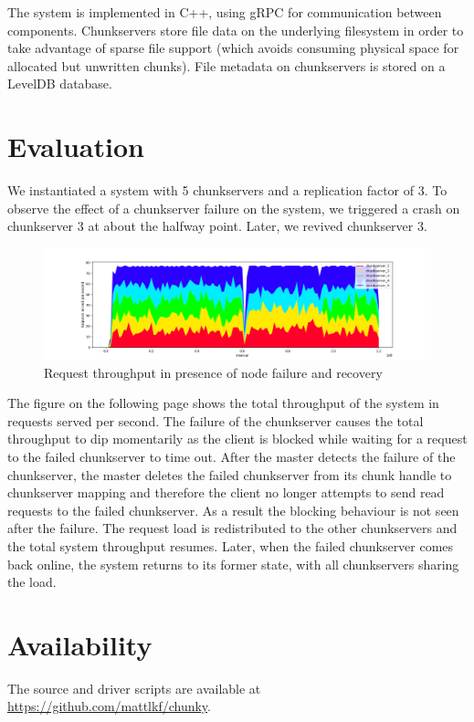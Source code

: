 \documentclass[letterpaper,twocolumn,10pt]{article}
\begin{document}
The system is implemented in C++, using gRPC for communication between components. Chunkservers store file data on the underlying filesystem in order to take advantage of sparse file support (which avoids consuming physical space for allocated but unwritten chunks). File metadata on chunkservers is stored on a LevelDB database.

\section{Evaluation}

We instantiated a system with 5 chunkservers and a replication factor of 3. To observe the effect of a chunkserver failure on the system, we triggered a crash on chunkserver 3 at about the halfway point. Later, we revived chunkserver 3.

\begin{figure}[]
	\centering
		\includegraphics[width=\textwidth]{node_failure_and_recovery.png}
	\caption{Request throughput in presence of node failure and recovery} 
\end{figure}

The figure on the following page shows the total throughput of the system in requests served per second. The failure of the chunkserver causes the total throughput to dip momentarily as the client is blocked while waiting for a request to the failed chunkserver to time out. After the master detects the failure of the chunkserver, the master deletes the failed chunkserver from its chunk handle to chunkserver mapping and therefore the client no longer attempts to send read requests to the failed chunkserver. As a result the blocking behaviour is not seen after the failure. The request load is redistributed to the other chunkservers and the total system throughput resumes. Later, when the failed chunkserver comes back online, the system returns to its former state, with all chunkservers sharing the load.

\section*{Availability}

The source and driver scripts are available at \url{https://github.com/mattlkf/chunky}.




\end{document}
